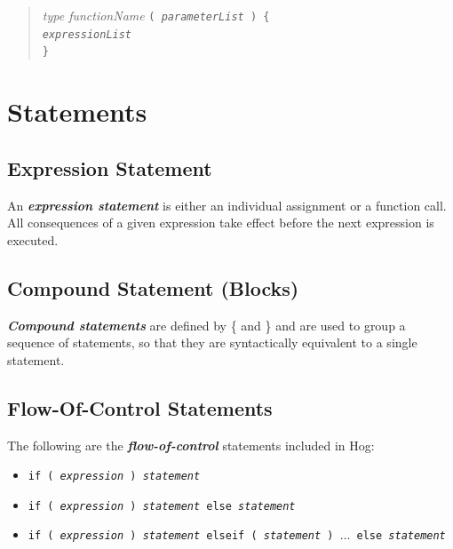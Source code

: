 \documentclass{report}
\begin{document}
\begin{quotation}
\emph{type functionName} \tt ( \rm \emph{parameterList} \tt ) \{ \rm \\
\indent \indent \emph{expressionList} \\
\indent \tt \}
\end{quotation}





\section{Statements} %
\label{sec:statements}

\subsection{Expression Statement} %
\label{sub:expression_statement}

An \textbf{\emph{expression statement}} is either an individual assignment or a
function call. All consequences of a given expression take effect before the next
expression is executed.


\subsection{Compound Statement (Blocks)} %
\label{sub:compound_statement}

\textbf{\emph{Compound statements}} are defined by \{ and \} and are used to
group a sequence of statements, so that they are syntactically equivalent to a
single statement.


\subsection{Flow-Of-Control Statements} %
\label{sub:flow_of_control_statements}

The following are the \textbf{\emph{flow-of-control}} statements included in Hog:

\begin{itemize}
  \item[] \tt if ( \rm \emph{expression} \tt ) \rm \emph{statement}
  \item[] \tt if ( \rm \emph{expression} \tt ) \rm \emph{statement} \tt else \rm \emph{statement}
  \item[] \tt if ( \rm \emph{expression} \tt ) \rm \emph{statement} \tt elseif ( \rm \emph{statement} \tt ) $\dots$ else 
  \rm \emph{statement}
\end{itemize}
\end{document}
